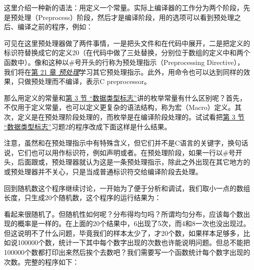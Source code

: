 这里介绍一种新的语法：用定义一个常量。实际上编译器的工作分为两个阶段，先是预处理（Preprocess）阶段，然后才是编译阶段，用的选项可以看到预处理之后、编译之前的程序，例如：




可见在这里预处理器做了两件事情，一是把头文件和在代码中展开，二是把定义的标识符替换成它的定义20（在代码中做了三处替换，分别位于数组的定义中和两个函数中）。像和这种以\#号开头的行称为预处理指示（Preprocessing Directive），我们将在\hyperlink{db.ch21.id2796862}{第 21 章 \emph{预处理}}学习其它预处理指示。此外，用命令也可以达到同样的效果，只做预处理而不编译，表示C preprocessor。



那么用定义的常量和\hyperlink{db.ch07s03.id2731288}{第 3 节 “数据类型标志”}讲的枚举常量有什么区别呢？首先，不仅用于定义常量，也可以定义更复杂的语法结构，称为宏（Macro）定义。其次，定义是在预处理阶段处理的，而枚举是在编译阶段处理的。试试看把\hyperlink{db.ch07s03.id2731288}{第 3 节 “数据类型标志”}习题2的程序改成下面这样是什么结果。




注意，虽然和在预处理指示中有特殊含义，但它们并不是C语言的关键字，换句话说，它们也可以用作标识符，例如声明或者。在预处理阶段，如果一行以\#号开头，后面跟或，预处理器就认为这是一条预处理指示，除此之外出现在其它地方的或预处理器并不关心，只是当成普通标识符交给编译阶段去处理。



回到随机数这个程序继续讨论，一开始为了便于分析和调试，我们取小一点的数组长度，只生成20个随机数，这个程序的运行结果为：




看起来很随机了。但随机性如何呢？分布得均匀吗？所谓均匀分布，应该每个数出现的概率是一样的。在上面的20个结果中，6出现了5次，而4和8一次也没出现过。但这说明不了什么问题，毕竟我们的样本太少了，才20个数，如果样本足够多，比如说100000个数，统计一下其中每个数字出现的次数也许能说明问题。但总不能把100000个数都打印出来然后挨个去数吧？我们需要写一个函数统计每个数字出现的次数。完整的程序如下：


